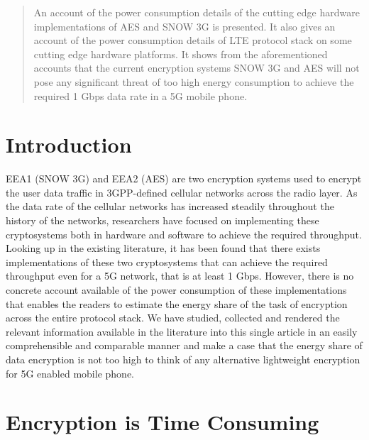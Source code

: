 \documentclass[12pt]{article}
\begin{document}
\maketitle



\begin{abstract}
An account of the power consumption details of the cutting edge hardware implementations of AES and SNOW 3G is presented. It also gives an account of the power consumption details of LTE protocol stack on some cutting edge hardware platforms. It shows from the aforementioned accounts that the current encryption systems SNOW 3G and AES will not pose any significant threat of too high energy consumption to achieve the required 1 Gbps data rate in a 5G mobile phone.
\end{abstract}


\section{Introduction}
EEA1 (SNOW 3G) and EEA2 (AES) are two encryption systems used to encrypt the user data traffic in 3GPP-defined cellular networks across the radio layer. As the data rate of the cellular networks has increased steadily throughout the history of the networks, researchers have focused on implementing these cryptosystems both in hardware and software to achieve the required throughput. Looking up in the existing literature, it has been found that there exists implementations of these two cryptosystems that can achieve the required throughput even for a 5G network, that is at least 1 Gbps. However, there is no concrete account available of the power consumption of these implementations that enables the readers to estimate the energy share of the task of encryption across the entire protocol stack. We have studied, collected and rendered the relevant information available in the literature into this single article in an easily comprehensible and comparable manner and make a case that the energy share of data encryption is not too high to think of any alternative lightweight encryption for 5G enabled mobile phone.


\section{Encryption is Time Consuming}
\end{document}
